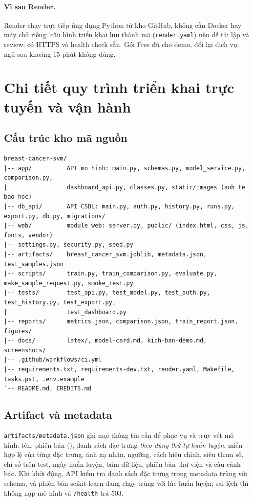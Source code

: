 \documentclass[12pt]{article}
\begin{document}
\paragraph{Vì sao Render.} Render chạy trực tiếp ứng dụng Python từ kho GitHub, không cần Docker hay máy chủ riêng;
cấu hình triển khai lưu thành mã (\texttt{render.yaml}) nên dễ tái lập và review; có HTTPS và health check sẵn.
Gói Free đủ cho demo, đổi lại dịch vụ ngủ sau khoảng 15 phút không dùng.

\section{Chi tiết quy trình triển khai trực tuyến và vận hành}

\subsection{Cấu trúc kho mã nguồn}
\begin{lstlisting}[language={},numbers=none,caption={Cấu trúc thư mục}]
breast-cancer-svm/
|-- app/          API mo hinh: main.py, schemas.py, model_service.py, comparison.py,
|                 dashboard_api.py, classes.py, static/images (anh te bao hoc)
|-- db_api/       API CSDL: main.py, auth.py, history.py, runs.py, export.py, db.py, migrations/
|-- web/          module web: server.py, public/ (index.html, css, js, fonts, vendor)
|-- settings.py, security.py, seed.py
|-- artifacts/    breast_cancer_svm.joblib, metadata.json, test_samples.json
|-- scripts/      train.py, train_comparison.py, evaluate.py, make_sample_request.py, smoke_test.py
|-- tests/        test_api.py, test_model.py, test_auth.py, test_history.py, test_export.py,
|                 test_dashboard.py
|-- reports/      metrics.json, comparison.json, train_report.json, figures/
|-- docs/         latex/, model-card.md, kich-ban-demo.md, screenshots/
|-- .github/workflows/ci.yml
|-- requirements.txt, requirements-dev.txt, render.yaml, Makefile, tasks.ps1, .env.example
`-- README.md, CREDITS.md
\end{lstlisting}

\subsection{Artifact và metadata}
\texttt{artifacts/metadata.json} ghi mọi thông tin cần để phục vụ và truy vết mô hình: tên, phiên bản
(\ModelVersion), danh sách \NFeatures{} đặc trưng \emph{theo đúng thứ tự huấn luyện}, miền hợp lệ của từng đặc trưng,
ánh xạ nhãn, ngưỡng, cách hiệu chỉnh, siêu tham số, chỉ số trên test, ngày huấn luyện, băm dữ liệu, phiên bản thư
viện và câu cảnh báo. Khi khởi động, API kiểm tra danh sách đặc trưng trong metadata trùng với schema, và phiên bản
scikit-learn đang chạy trùng với lúc huấn luyện; sai lệch thì không nạp mô hình và \texttt{/health} trả 503.
\end{document}
